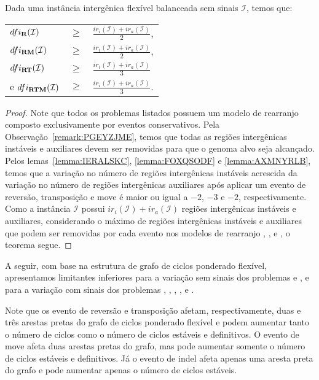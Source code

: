 \begin{theorem}\label{theorem:KKKUCDHN}
Dada uma instância intergênica flexível balanceada sem sinais $\mathcal{I}$, temos que:

\begin{tabular}{lll}
  $dfi_{\textbf{R}}(\mathcal{I})$      & $ \ge $ & $\frac{ir_i(\mathcal{I}) + ir_a(\mathcal{I})}{2}$, \\ 
  $dfi_{\textbf{RM}}(\mathcal{I})$     & $ \ge $ & $\frac{ir_i(\mathcal{I}) + ir_a(\mathcal{I})}{2}$, \\
  $dfi_{\textbf{RT}}(\mathcal{I})$     & $ \ge $ & $\frac{ir_i(\mathcal{I}) + ir_a(\mathcal{I})}{3}$  \\
  e $dfi_{\textbf{RTM}}(\mathcal{I})$  & $ \ge $ & $\frac{ir_i(\mathcal{I}) + ir_a(\mathcal{I})}{3}$. \\
\end{tabular}
\end{theorem}
\begin{proof}
Note que todos os problemas listados possuem um modelo de rearranjo composto exclusivamente por eventos conservativos. Pela Observação~\ref{remark:PGEYZJME}, temos que todas as regiões intergênicas instáveis e auxiliares devem ser removidas para que o genoma alvo seja alcançado. Pelos lemas~\ref{lemma:IERALSKC}, \ref{lemma:FOXQSODF} e \ref{lemma:AXMNYRLB}, temos que a variação no número de regiões intergênicas instáveis acrescida da variação no número de regiões intergênicas auxiliares após aplicar um evento de reversão, transposição e move é maior ou igual a $-2$, $-3$ e $-2$, respectivamente. Como a instância $\mathcal{I}$ possui $ir_i(\mathcal{I}) + ir_a(\mathcal{I})$ regiões intergênicas instáveis e auxiliares, considerando o máximo de regiões intergênicas instáveis e auxiliares que podem ser removidas por cada evento nos modelos de rearranjo \R{}, \RM{}, \RT{} e \RTM{}, o teorema segue.
\end{proof}

A seguir, com base na estrutura de grafo de ciclos ponderado flexível, apresentamos limitantes inferiores para a variação sem sinais dos problemas \SbFIT{} e \SbFITM{}, e para a variação com sinais dos problemas \SbFIR{}, \SbFIRI{}, \SbFIRM{}, \SbFIRMI{}, \SbFIRT{} e \SbFIRTM{}.

Note que os evento de reversão e transposição afetam, respectivamente, duas e três arestas pretas do grafo de ciclos ponderado flexível e podem aumentar tanto o número de ciclos como o número de ciclos estáveis e definitivos. O evento de move afeta duas arestas pretas do grafo, mas pode aumentar somente o número de ciclos estáveis e definitivos. Já o evento de indel afeta apenas uma aresta preta do grafo e pode aumentar apenas o número de ciclos estáveis.

